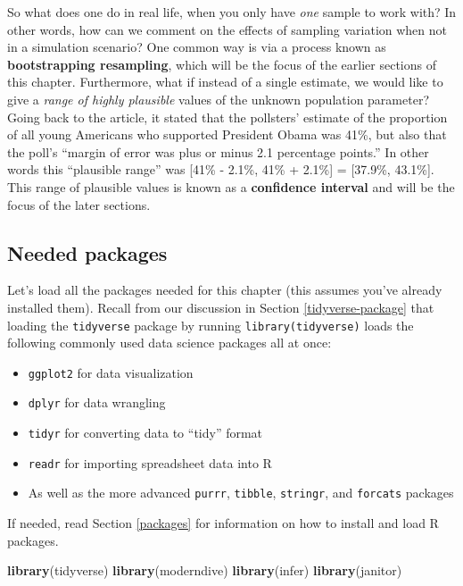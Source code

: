 \documentclass[12pt, krantz2,]{krantz}
\makeatletter
\newenvironment{Shaded}{\begin{snugshade}}{\end{snugshade}}
\newcommand{\KeywordTok}[1]{\textcolor[rgb]{0.27,0.27,0.27}{\textbf{#1}}}
\newcommand{\NormalTok}[1]{#1}
\providecommand{\tightlist}{%
  \setlength{\itemsep}{0pt}\setlength{\parskip}{0pt}}
\newenvironment{kframe}{%
\medskip{}
\setlength{\fboxsep}{.8em}
 \def\at@end@of@kframe{}%
 \ifinner\ifhmode%
  \def\at@end@of@kframe{\end{minipage}}%
  \begin{minipage}{\columnwidth}%
 \fi\fi%
 \def\FrameCommand##1{\hskip\@totalleftmargin \hskip-\fboxsep
 \colorbox{shadecolor}{##1}\hskip-\fboxsep
     \hskip-\linewidth \hskip-\@totalleftmargin \hskip\columnwidth}%
 \MakeFramed {\advance\hsize-\width
   \@totalleftmargin\z@ \linewidth\hsize
   \@setminipage}}%
 {\par\unskip\endMakeFramed%
 \at@end@of@kframe}
\renewenvironment{Shaded}{\begin{kframe}}{\end{kframe}}
\makeatother
\begin{document}
So what does one do in real life, when you only have \emph{one} sample to work with? In other words, how can we comment on the effects of sampling variation when not in a simulation scenario? One common way is via a process known as \textbf{bootstrapping resampling}, which will be the focus of the earlier sections of this chapter. Furthermore, what if instead of a single estimate, we would like to give a \emph{range of highly plausible} values of the unknown population parameter? Going back to the article, it stated that the pollsters' estimate of the proportion of all young Americans who supported President Obama was 41\%, but also that the poll's ``margin of error was plus or minus 2.1 percentage points.'' In other words this ``plausible range'' was {[}41\% - 2.1\%, 41\% + 2.1\%{]} = {[}37.9\%, 43.1\%{]}. This range of plausible values is known as a \textbf{confidence interval} and will be the focus of the later sections.

\hypertarget{needed-packages-6}{%
\subsection*{Needed packages}\label{needed-packages-6}}


Let's load all the packages needed for this chapter (this assumes you've already installed them). Recall from our discussion in Section \ref{tidyverse-package} that loading the \texttt{tidyverse} package by running \texttt{library(tidyverse)} loads the following commonly used data science packages all at once:

\begin{itemize}
\tightlist
\item
  \texttt{ggplot2} for data visualization
\item
  \texttt{dplyr} for data wrangling
\item
  \texttt{tidyr} for converting data to ``tidy'' format
\item
  \texttt{readr} for importing spreadsheet data into R
\item
  As well as the more advanced \texttt{purrr}, \texttt{tibble}, \texttt{stringr}, and \texttt{forcats} packages
\end{itemize}

If needed, read Section \ref{packages} for information on how to install and load R packages.

\begin{Shaded}
\begin{Highlighting}[]
\KeywordTok{library}\NormalTok{(tidyverse)}
\KeywordTok{library}\NormalTok{(moderndive)}
\KeywordTok{library}\NormalTok{(infer)}
\KeywordTok{library}\NormalTok{(janitor)}
\end{Highlighting}
\end{Shaded}
\end{document}
